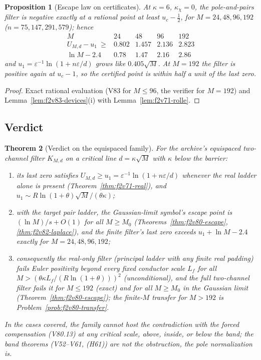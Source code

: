 \documentclass[11pt]{article}
\newtheorem{theorem}{Theorem}[section]
\newtheorem{proposition}[theorem]{Proposition}
\theoremstyle{definition}
\theoremstyle{remark}
\begin{document}
\begin{proposition}[Escape law on certificates]
\label{prop:f2v84-law}
At \(\kappa=6\), \(\kappa_\chi=0\), the pole-and-pairs filter is negative
exactly at a rational point at least \(u_c-\tfrac12\), for
\(M=24,48,96,192\) (\(n=75,147,291,579\)); hence
\begin{equation}
\begin{array}{c|cccc}
 M & 24 & 48 & 96 & 192\\ \hline
 U_{M,d}-u_1\ \ge & 0.802 & 1.457 & 2.136 & 2.823\\
 \ln M-2.4 & 0.78 & 1.47 & 2.16 & 2.86
\end{array}
\label{eq:f2v84-law}
\end{equation}
and \(u_1=\varepsilon^{-1}\ln(1+n\varepsilon/d)\) grows like
\(0.405\sqrt M\).  At \(M=192\) the filter is positive again at
\(u_c-1\), so the certified point is within half a unit of the last zero.
\end{proposition}

\begin{proof}
Exact rational evaluation (V83 for \(M\le96\), the verifier for
\(M=192\)) and Lemma~\ref{lem:f2v83-devices}(i) with
Lemma~\ref{lem:f2v71-rolle}.
\end{proof}

\subsection{Verdict}

\begin{theorem}[Verdict on the equispaced family]
\label{thm:f2v84-verdict}
For the archive's equispaced two-channel filter \(K_{M,d}\) on a critical
line \(d=\kappa\sqrt M\) with \(\kappa\) below the barrier:
\begin{enumerate}[label=\textup{(\roman*)}]
\item its last zero satisfies \(U_{M,d}\ge u_1=\varepsilon^{-1}\ln(1+n\varepsilon/d)\)
whenever the real ladder alone is present (Theorem~\ref{thm:f2v71-real}),
and \(u_1\sim R\ln(1+\theta)\sqrt M/(\theta\kappa)\);
\item with the target pair ladder, the Gaussian-limit symbol's escape
point is \((\ln M)/s+O(1)\) for all \(M\ge M_0\) (Theorems~\ref{thm:f2v80-escape},
\ref{thm:f2v82-laplace}), and the finite filter's last zero exceeds
\(u_1+\ln M-2.4\) exactly for \(M=24,48,96,192\);
\item consequently the real-only filter (principal ladder with any
finite real padding) fails Euler positivity beyond every fixed conductor
scale \(L_f\) for all \(M>(\theta\kappa L_f/(R\ln(1+\theta)))^2\)
(unconditional), and the full two-channel filter fails it for
\(M\le192\) (exact) and for all \(M\ge M_0\) in the Gaussian limit
(Theorem~\ref{thm:f2v80-escape}); the finite-\(M\) transfer for
\(M>192\) is Problem~\ref{prob:f2v80-transfer}.
\end{enumerate}
In the cases covered, the family cannot host the contradiction with the
forced compensation (V80.13) at any critical scale, above, inside, or
below the band; the band theorems (V52--V61, (H61)) are not the
obstruction, the pole normalization is.
\end{theorem}
\end{document}
